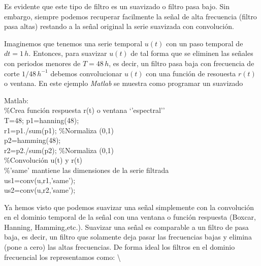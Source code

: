 \documentclass[
]{agujournal2019}
\begin{document}
Es evidente que este tipo de filtro es un suavizado o filtro pasa bajo.
Sin embargo, siempre podemos recuperar facilmente la señal de alta
frecuencia (filtro pasa altas) restando a la señal original la serie
suavizada con convolución.

Imaginemos que tenemos una serie temporal \(u(t)\) con un paso temporal
de \(dt=1\,{ h}\). Entonces, para suavizar \(u(t)\) de tal forma que se
eliminen las señales con periodos menores de \(T=48\,{ h}\), es decir,
un filtro pasa baja con frecuencia de corte \(1/48\,{ h}^{-1}\) debemos
convolucionar \(u(t)\) con una función de resouesta \(r(t)\) o ventana.
En este ejemplo \emph{Matlab} se muestra como programar un suavizado

\begin{framed}
{\textbf \noindent Matlab}:\\
\%Crea función respuesta r(t) o ventana `'espectral''\\
T=48; %
p1=hanning(48);\\
r1=p1./sum(p1); \%Normaliza (0,1)\\
p2=hamming(48);\\
r2=p2./sum(p2); \%Normaliza (0,1)\\

\%Convolución u(t) y r(t)\\
\%'same' mantiene las dimensiones de la serie filtrada\\
us1=conv(u,r1,'same');\\
us2=conv(u,r2,'same');\\

\end{framed}

Ya hemos visto que podemos suavizar una señal simplemente con la
convolución en el dominio temporal de la señal con una ventana o función
respuesta (Boxcar, Hanning, Hamming,etc.). Suavizar una señal es
comparable a un filtro de pasa baja, es decir, un filtro que solamente
deja pasar las frecuencias bajas y elimina (pone a cero) las altas
frecuencias. De forma ideal los filtros en el dominio frecuencial los
representamos como: \textbackslash{}
\end{document}
